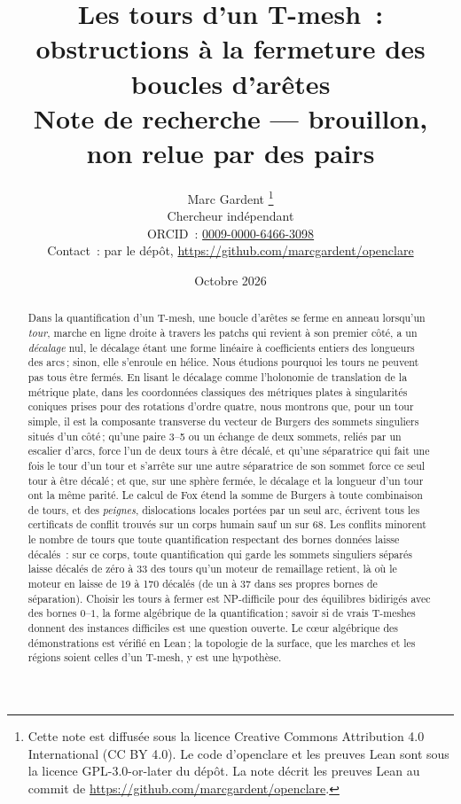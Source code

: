 \documentclass[11pt,a4paper]{article}
\title{Les tours d'un T-mesh~:\\
obstructions à la fermeture des boucles d'arêtes\\[0.5em]
\large Note de recherche --- brouillon, non relue par des pairs}
\author{Marc Gardent%
\thanks{Cette note est diffusée sous la licence Creative Commons Attribution
4.0 International (CC BY 4.0). Le code d'openclare et les preuves Lean sont
sous la licence GPL-3.0-or-later du dépôt. La note décrit les preuves Lean au
commit \texttt{\enginecommit} de
\url{https://github.com/marcgardent/openclare}.}\\
\normalsize Chercheur indépendant\\
\normalsize ORCID~: \href{https://orcid.org/0009-0000-6466-3098}{0009-0000-6466-3098}\\
\normalsize Contact~: par le dépôt,
\url{https://github.com/marcgardent/openclare}}
\date{Octobre 2026}
\begin{document}
\maketitle

\begin{center}
\end{center}

\begin{abstract}
Dans la quantification d'un T-mesh, une boucle d'arêtes se ferme en anneau
lorsqu'un \emph{tour}, marche en ligne droite à travers les patchs qui revient
à son premier côté, a un \emph{décalage} nul, le décalage étant une forme
linéaire à coefficients entiers des longueurs des arcs\,; sinon, elle
s'enroule en hélice. Nous étudions pourquoi les tours ne peuvent pas tous être
fermés. En lisant le décalage comme l'holonomie de translation de la métrique
plate, dans les coordonnées classiques des métriques plates à singularités
coniques prises pour des rotations d'ordre quatre, nous montrons que, pour un tour simple, il est la composante transverse
du vecteur de Burgers des sommets singuliers situés d'un côté\,; qu'une paire
3--5 ou un échange de deux sommets, reliés par un escalier d'arcs, force l'un
de deux tours à être décalé, et qu'une séparatrice qui fait une fois le tour
d'un tour et s'arrête sur une autre séparatrice de son sommet force ce seul tour
à être décalé\,; et que, sur une sphère fermée, le décalage et la longueur d'un
tour ont la même parité. Le calcul de Fox étend la somme de Burgers à toute
combinaison de tours, et des \emph{peignes}, dislocations locales portées par
un seul arc, écrivent tous les certificats de conflit trouvés sur un corps
humain sauf un sur $68$.
Les conflits minorent le nombre de tours que toute quantification
respectant des bornes données laisse décalés~: sur ce corps, toute
quantification qui garde les sommets singuliers séparés laisse décalés de
zéro à 33 des tours qu'un moteur de remaillage retient, là où le moteur en
laisse de 19 à 170 décalés (de un à 37 dans ses propres bornes de séparation). Choisir les tours à fermer
est NP-difficile pour des équilibres bidirigés avec des bornes $0$--$1$, la
forme algébrique de la quantification\,; savoir si de vrais T-meshes donnent
des instances difficiles est une question ouverte. Le cœur algébrique des démonstrations est vérifié en Lean\,; la topologie de la
surface, que les marches et les régions soient celles d'un T-mesh, y est une
hypothèse.
\end{abstract}
\end{document}
